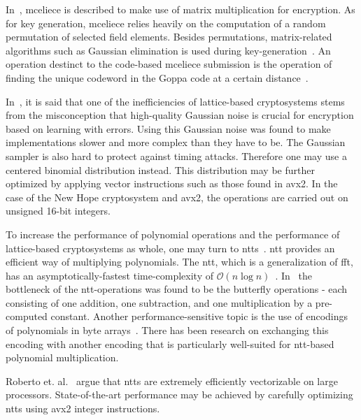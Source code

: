 
In~\cite{wang2018}, \gls{mceliece} is described to make use of matrix multiplication for encryption. As for key generation, \gls{mceliece} relies heavily on the computation of a random permutation of selected field elements. Besides permutations, matrix-related algorithms such as Gaussian elimination is used during key-generation~\cite{mceliece2020}. An operation destinct to the code-based \gls{mceliece} submission is the operation of finding the unique codeword in the Goppa code at a certain distance~\cite{mceliece2020}.


In~\cite{alkim2016}, it is said that one of the inefficiencies of lattice-based cryptosystems stems from the misconception that high-quality Gaussian noise is crucial for encryption based on learning with errors. Using this Gaussian noise was found to make implementations slower and more complex than they have to be. The Gaussian sampler is also hard to protect against timing attacks. Therefore one may use a centered binomial distribution instead. This distribution may be further optimized by applying vector instructions such as those found in \gls{avx2}. In the case of the New Hope cryptosystem and \gls{avx2}, the operations are carried out on unsigned 16-bit integers.

To increase the performance of polynomial operations and the performance of lattice-based cryptosystems as whole, one may turn to \glspl{ntt}~\cite{alkim2016}. \gls{ntt} provides an efficient way of multiplying polynomials. The \gls{ntt}, which is a generalization of \gls{fft}, has an asymptotically-fastest time-complexity of $\mathcal{O}(n\log{}n)$~\cite{roy2020}. In~\cite{alkim2016} the bottleneck of the \gls{ntt}-operations was found to be the butterfly operations - each consisting of one addition, one subtraction, and one multiplication by a pre-computed constant. Another performance-sensitive topic is the use of encodings of polynomials in byte arrays~\cite{alkim2016}. There has been research on exchanging this encoding with another encoding that is particularly well-suited for \gls{ntt}-based polynomial multiplication.

Roberto et. al.~\cite{kyber2021} argue that \glspl{ntt} are extremely efficiently vectorizable on large processors. State-of-the-art performance may be achieved by carefully optimizing \glspl{ntt} using \gls{avx2} integer instructions.

